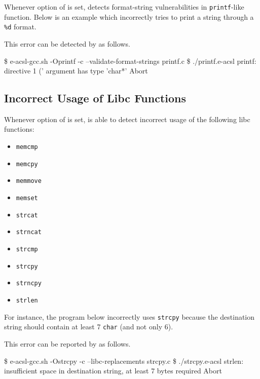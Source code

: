 Whenever option  of \eacslgcc is set, \eacsl
detects format-string vulnerabilities in \texttt{printf}-like function. Below is
an example which incorrectly tries to print a string through a \texttt{\%d}
format.


This error can be detected by \eacsl as follows.

\begin{shell}
\$ e-acsl-gcc.sh -Oprintf -c --validate-format-strings printf.c
\$ ./printf.e-acsl
printf: directive 1 ('%
argument has type 'char*'
Abort
\end{shell}

\subsection{Incorrect Usage of Libc Functions}

Whenever option  of \eacslgcc is set, \eacsl is
able to detect incorrect usage of the following libc functions:
\begin{itemize}
  \item \texttt{memcmp}
  \item \texttt{memcpy}
  \item \texttt{memmove}
  \item \texttt{memset}
  \item \texttt{strcat}
  \item \texttt{strncat}
  \item \texttt{strcmp}
  \item \texttt{strcpy}
  \item \texttt{strncpy}
  \item \texttt{strlen}
\end{itemize}

For instance, the program below incorrectly uses \texttt{strcpy} because the
destination string should contain at least 7 \texttt{char} (and not only 6).


This error can be reported by \eacsl as follows.

\begin{shell}
\$ e-acsl-gcc.sh -Ostrcpy -c --libc-replacements strcpy.c
\$ ./strcpy.e-acsl
strlen: insufficient space in destination string, at least 7 bytes required
Abort
\end{shell}

